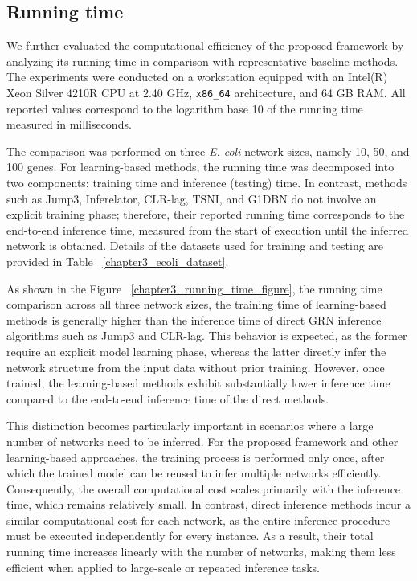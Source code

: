 \subsection{Running time}
We further evaluated the computational efficiency of the proposed framework by analyzing its running time in comparison with representative baseline methods. The experiments were conducted on a workstation equipped with an Intel(R) Xeon Silver 4210R CPU at 2.40 GHz, \texttt{x86\_64} architecture, and 64 GB RAM. All reported values correspond to the logarithm base 10 of the running time measured in milliseconds.

The comparison was performed on three \textit{E. coli} network sizes, namely 10, 50, and 100 genes. For learning-based methods, the running time was decomposed into two components: training time and inference (testing) time. In contrast, methods such as Jump3, Inferelator, CLR-lag, TSNI, and G1DBN do not involve an explicit training phase; therefore, their reported running time corresponds to the end-to-end inference time, measured from the start of execution until the inferred network is obtained. Details of the datasets used for training and testing are provided in Table ~\ref{chapter3_ecoli_dataset}.

As shown in the Figure ~\ref{chapter3_running_time_figure}, the running time comparison across all three network sizes, the training time of learning-based methods is generally higher than the inference time of direct GRN inference algorithms such as Jump3 and CLR-lag. This behavior is expected, as the former require an explicit model learning phase, whereas the latter directly infer the network structure from the input data without prior training. However, once trained, the learning-based methods exhibit substantially lower inference time compared to the end-to-end inference time of the direct methods.

This distinction becomes particularly important in scenarios where a large number of networks need to be inferred. For the proposed framework and other learning-based approaches, the training process is performed only once, after which the trained model can be reused to infer multiple networks efficiently. Consequently, the overall computational cost scales primarily with the inference time, which remains relatively small. In contrast, direct inference methods incur a similar computational cost for each network, as the entire inference procedure must be executed independently for every instance. As a result, their total running time increases linearly with the number of networks, making them less efficient when applied to large-scale or repeated inference tasks.


